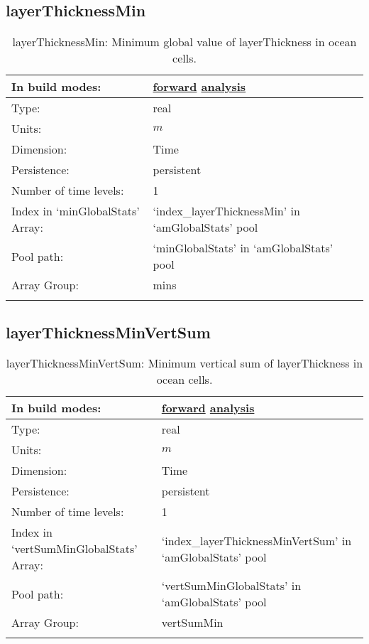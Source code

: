 \subsection[layerThicknessMin]{layerThicknessMin}
\label{subsec:var_sec_amGlobalStats_layerThicknessMin}
\begin{center}
\begin{longtable}{| p{2.0in} | p{4.0in} |}
        \hline 
        In build modes: & \hyperref[subsec:forward_var_tab_amGlobalStats]{forward} \hyperref[subsec:analysis_var_tab_amGlobalStats]{analysis} \\
        \hline 
        Type: & real \\
        \hline 
        Units: & $m$ \\
        \hline 
        Dimension: & Time \\
        \hline 
        Persistence: & persistent \\
        \hline 
        Number of time levels: & 1 \\
        \hline 
		 Index in `minGlobalStats' Array: & `index\_layerThicknessMin' in `amGlobalStats' pool \\
		 \hline 
            Pool path: & `minGlobalStats' in `amGlobalStats' pool \\
		 \hline 
		 Array Group: & mins \\
		 \hline 
    \caption{layerThicknessMin: Minimum global value of layerThickness in ocean cells.}
\end{longtable}
\end{center}
\subsection[layerThicknessMinVertSum]{layerThicknessMinVertSum}
\label{subsec:var_sec_amGlobalStats_layerThicknessMinVertSum}
\begin{center}
\begin{longtable}{| p{2.0in} | p{4.0in} |}
        \hline 
        In build modes: & \hyperref[subsec:forward_var_tab_amGlobalStats]{forward} \hyperref[subsec:analysis_var_tab_amGlobalStats]{analysis} \\
        \hline 
        Type: & real \\
        \hline 
        Units: & $m$ \\
        \hline 
        Dimension: & Time \\
        \hline 
        Persistence: & persistent \\
        \hline 
        Number of time levels: & 1 \\
        \hline 
		 Index in `vertSumMinGlobalStats' Array: & `index\_layerThicknessMinVertSum' in `amGlobalStats' pool \\
		 \hline 
            Pool path: & `vertSumMinGlobalStats' in `amGlobalStats' pool \\
		 \hline 
		 Array Group: & vertSumMin \\
		 \hline 
    \caption{layerThicknessMinVertSum: Minimum vertical sum of layerThickness in ocean cells.}
\end{longtable}
\end{center}
